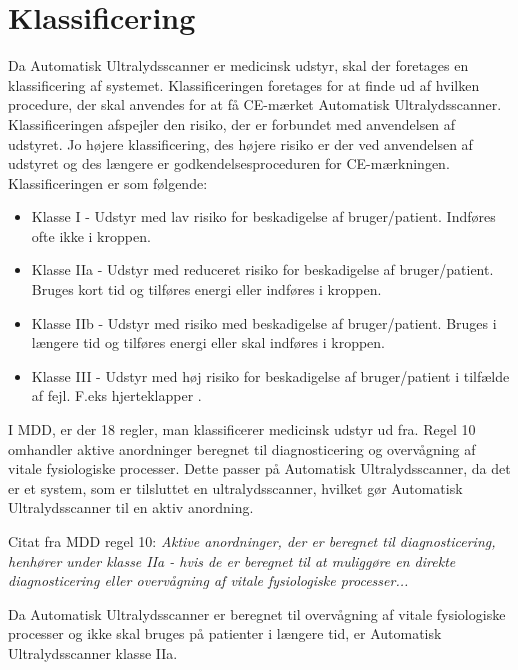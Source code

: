 \section{Klassificering}
Da Automatisk Ultralydsscanner er medicinsk udstyr, skal der foretages en klassificering af systemet. Klassificeringen foretages for at finde ud af hvilken procedure, der skal anvendes for at få CE-mærket Automatisk Ultralydsscanner. Klassificeringen afspejler den risiko, der er forbundet med anvendelsen af udstyret. Jo højere klassificering, des højere risiko er der ved anvendelsen af udstyret og des længere er godkendelsesproceduren for CE-mærkningen. 
Klassificeringen er som følgende: 
\let\labelitemi\labelitemii \begin{itemize}
\item Klasse I - Udstyr med lav risiko for beskadigelse af bruger/patient. Indføres ofte ikke i kroppen.
\item Klasse IIa - Udstyr med reduceret risiko for beskadigelse af bruger/patient. Bruges kort tid og tilføres energi eller indføres i kroppen.  
\item Klasse IIb -  Udstyr med risiko med beskadigelse af bruger/patient. Bruges i længere tid og tilføres energi eller skal indføres i kroppen. 
\item Klasse III - Udstyr med høj risiko for beskadigelse af bruger/patient i tilfælde af fejl. F.eks hjerteklapper \cite{Delta}. 
\end{itemize} 

I MDD, er der 18 regler, man klassificerer medicinsk udstyr ud fra. 
Regel 10 omhandler aktive anordninger beregnet til diagnosticering og overvågning af vitale fysiologiske processer. Dette passer på Automatisk Ultralydsscanner, da det er et system, som er tilsluttet en ultralydsscanner, hvilket gør Automatisk Ultralydsscanner til en aktiv anordning.  

Citat fra MDD regel 10:  
\emph{Aktive anordninger, der er beregnet til diagnosticering, henhører under klasse IIa - hvis de er beregnet til at muliggøre en direkte diagnosticering eller overvågning af vitale fysiologiske processer...}

Da Automatisk Ultralydsscanner er beregnet til overvågning af vitale fysiologiske processer og ikke skal bruges på patienter i længere tid, er Automatisk Ultralydsscanner klasse IIa. 

